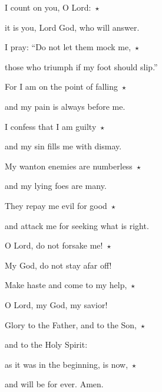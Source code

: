 \noindent I count on you, O Lord:~$\star$~\nopagebreak

it is you, Lord God, who will answer.

\noindent I pray: “Do not let them mock me,~$\star$~\nopagebreak

those who triumph if my foot should slip.”

\noindent For I am on the point of falling~$\star$~\nopagebreak

and my pain is always before me.

\noindent I confess that I am guilty~$\star$~\nopagebreak

and my sin fills me with dismay.

\noindent My wanton enemies are numberless~$\star$~\nopagebreak

and my lying foes are many.

\noindent They repay me evil for good~$\star$~\nopagebreak

and attack me for seeking what is right.

\noindent O Lord, do not forsake me!~$\star$~\nopagebreak

My God, do not stay afar off!

\noindent Make haste and come to my help,~$\star$~\nopagebreak

O Lord, my God, my savior!

\noindent Glory to the Father, and to the Son,~$\star$~\nopagebreak

and to the Holy Spirit:

\noindent as it was in the beginning, is now,~$\star$~\nopagebreak

and will be for ever. Amen.